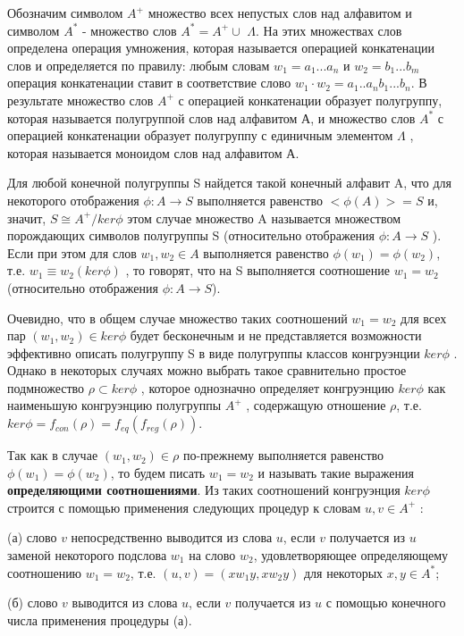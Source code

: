 \documentclass[spec, och, labwork]{shiza}
\begin{document}
Обозначим символом $A^+$ множество всех непустых слов над алфавитом и символом $A^*$ - множество слов $A^* = A^+ \cup$ {$\Lambda$}. 
На этих множествах слов определена операция умножения, которая называется операцией конкатенации слов и определяется по
правилу: любым словам $w_1 = a_1...a_n$ и $w_2 = b_1...b_m$ операция конкатенации ставит в соответствие слово 
$w_1 \cdot w_2 = a_1..a_nb_1...b_n$. В результате множество слов $A^+$ с операцией конкатенации образует
полугруппу, которая называется полугруппой слов над алфавитом $А$, и множество слов $A^*$ с операцией конкатенации образует
полугруппу с единичным элементом $\Lambda$ , которая называется моноидом слов над алфавитом А.

Для любой конечной полугруппы S найдется такой конечный алфавит A, что для некоторого отображения
$\phi : A \rightarrow S$ выполняется равенство $<\phi(A)>=S$ и, значит, $S \cong A^+/ ker \phi$ этом случае множество A
называется множеством порождающих символов полугруппы S (относительно отображения $\phi : A \rightarrow S$ ). Если
при этом для слов $w_1,w_2 \in A$ выполняется равенство $\phi(w_1) = \phi(w_2)$, т.е. $w_1 \equiv w_2(ker\phi)$ , то
говорят, что на S выполняется соотношение $w_1 = w_2$ (относительно отображения $\phi : A \rightarrow S$).

Очевидно, что в общем случае множество таких соотношений $w_1 = w_2$ для всех пар $(w_1, w_2) \in ker\phi$ будет бесконечным
и не представляется возможности эффективно описать полугруппу S в виде полугруппы классов конгруэнции $ker\phi$ . Однако в
некоторых случаях можно выбрать такое сравнительно простое подмножество $\rho \subset ker\phi$ , которое однозначно определяет
конгруэнцию $ker\phi$ как наименьшую конгруэнцию полугруппы $A^+$ , содержащую отношение $\rho$, т.е. $ker\phi = f_{con}(\rho) = f_{eq}(f_{reg}(\rho))$.

Так как в случае $(w_1, w_2) \in \rho$ по-прежнему выполняется равенство $\phi(w_1) = \phi(w_2)$, то будем писать
$w_1 = w_2$ и называть такие выражения \textbf{определяющими соотношениями}. Из таких соотношений конгруэнция $ker\phi$ строится
с помощью применения следующих процедур к словам $u,v \in A^+$ :

(а) слово $v$ непосредственно выводится из слова $u$, если $v$ получается из $u$ заменой некоторого подслова $w_1$ на слово
$w_2$, удовлетворяющее определяющему соотношению $w_1 = w_2$, т.е. $(u, v) = (xw_1y, xw_2y)$ для некоторых $x, y \in A^*$;

(б) слово $v$ выводится из слова $u$, если $v$ получается из $u$ с помощью конечного числа применения процедуры (а).
\end{document}
